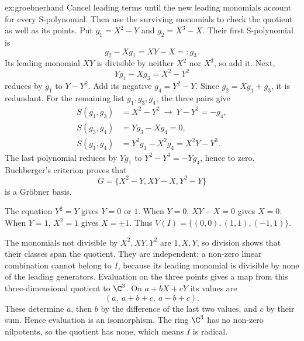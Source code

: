 \begin{solution}{ex:groebnerhand}
\idea Cancel leading terms until the new leading monomials account for every S-polynomial. Then use the surviving monomials to check the quotient as well as its points.
\writeup Put $g_1=X^2-Y$ and $g_2=X^3-X$. Their first S-polynomial is
\[
g_2-Xg_1=XY-X=:g_3.
\]
Its leading monomial $XY$ is divisible by neither $X^2$ nor $X^3$, so add it. Next,
\[
Yg_1-Xg_3=X^2-Y^2
\]
reduces by $g_1$ to $Y-Y^2$. Add its negative $g_4=Y^2-Y$. Since $g_2=Xg_1+g_3$, it is redundant. For the remaining list $g_1,g_3,g_4$, the three pairs give
\[
\begin{aligned}
S(g_1,g_3)&=X^2-Y^2\ \longrightarrow\ Y-Y^2=-g_4,\\
S(g_3,g_4)&=Yg_3-Xg_4=0,\\
S(g_1,g_4)&=Y^2g_1-X^2g_4=X^2Y-Y^3.
\end{aligned}
\]
The last polynomial reduces by $Yg_1$ to $Y^2-Y^3=-Yg_4$, hence to zero. Buchberger's criterion proves that
\[
G=\{X^2-Y,XY-X,Y^2-Y\}
\]
is a Gröbner basis.

The equation $Y^2=Y$ gives $Y=0$ or $1$. When $Y=0$, $XY-X=0$ gives $X=0$. When $Y=1$, $X^2=1$ gives $X=\pm1$. Thus $V(I)=\{(0,0),(1,1),(-1,1)\}$.

The monomials not divisible by $X^2,XY,Y^2$ are $1,X,Y$, so division shows that their classes span the quotient. They are independent: a non-zero linear combination cannot belong to $I$, because its leading monomial is divisible by none of the leading generators. Evaluation on the three points gives a map from this three-dimensional quotient to $\C^3$. On $a+bX+cY$ its values are
\[
(a,\ a+b+c,\ a-b+c).
\]
These determine $a$, then $b$ by the difference of the last two values, and $c$ by their sum. Hence evaluation is an isomorphism. The ring $\C^3$ has no non-zero nilpotents, so the quotient has none, which means $I$ is radical.
\end{solution}

